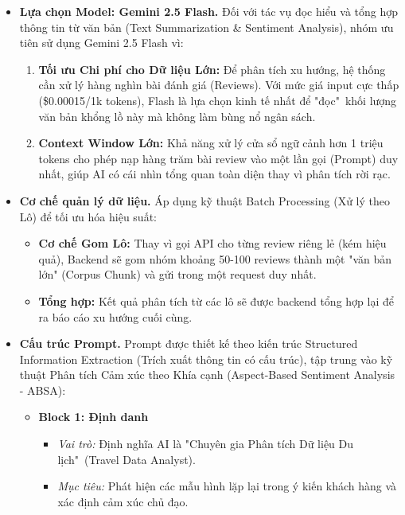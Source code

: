 \begin{itemize} 
    \item \textbf{Lựa chọn Model: Gemini 2.5 Flash.} Đối với tác vụ đọc hiểu và tổng hợp thông tin từ văn bản (Text Summarization \& Sentiment Analysis), nhóm ưu tiên sử dụng Gemini 2.5 Flash vì:
    \begin{enumerate}[label=\arabic*., leftmargin=*]
        \item \textbf{Tối ưu Chi phí cho Dữ liệu Lớn:} Để phân tích xu hướng, hệ thống cần xử lý hàng nghìn bài đánh giá (Reviews). Với mức giá input cực thấp (\$0.00015/1k tokens), Flash là lựa chọn kinh tế nhất để "đọc"\ khối lượng văn bản khổng lồ này mà không làm bùng nổ ngân sách.
        
        \item \textbf{Context Window Lớn:} Khả năng xử lý cửa sổ ngữ cảnh hơn 1 triệu tokens cho phép nạp hàng trăm bài review vào một lần gọi (Prompt) duy nhất, giúp AI có cái nhìn tổng quan toàn diện thay vì phân tích rời rạc.
    \end{enumerate}

    \item \textbf{Cơ chế quản lý dữ liệu.} Áp dụng kỹ thuật Batch Processing (Xử lý theo Lô) để tối ưu hóa hiệu suất:
    \begin{itemize}
        \item \textbf{Cơ chế Gom Lô:} Thay vì gọi API cho từng review riêng lẻ (kém hiệu quả), Backend sẽ gom nhóm khoảng 50-100 reviews thành một "văn bản lớn" (Corpus Chunk) và gửi trong một request duy nhất.
        \item \textbf{Tổng hợp:} Kết quả phân tích từ các lô sẽ được backend tổng hợp lại để ra báo cáo xu hướng cuối cùng.
    \end{itemize}

    \item \textbf{Cấu trúc Prompt.} Prompt được thiết kế theo kiến trúc Structured Information Extraction (Trích xuất thông tin có cấu trúc), tập trung vào kỹ thuật Phân tích Cảm xúc theo Khía cạnh (Aspect-Based Sentiment Analysis - ABSA):
    \begin{itemize}
        \item \textbf{Block 1: Định danh}
        \begin{itemize}
            \item \textit{Vai trò:} Định nghĩa AI là "Chuyên gia Phân tích Dữ liệu Du lịch"\ (Travel Data Analyst).
            \item \textit{Mục tiêu:} Phát hiện các mẫu hình lặp lại trong ý kiến khách hàng và xác định cảm xúc chủ đạo.
        \end{itemize}
        

\end{itemize}
\end{itemize}
